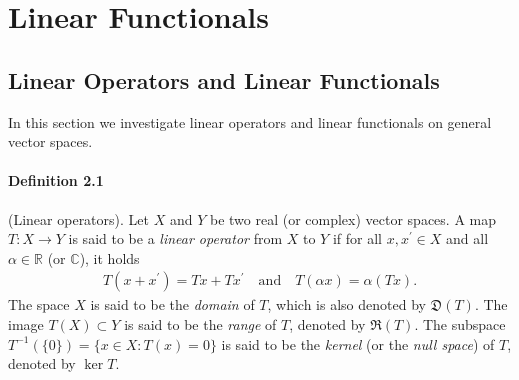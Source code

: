 \documentclass{article}
\begin{document}
\newpage
\section{Linear Functionals}
\subsection{Linear Operators and Linear Functionals}
In this section we investigate linear operators and linear functionals on general vector spaces.
\paragraph{Definition 2.1\label{def:2.1}} (Linear operators). Let $X$ and $Y$ be two real (or complex) vector spaces. A map $T:X\to Y$ is said to be a \textit{linear operator} from $X$ to $Y$ if for all $x,x^\prime\in X$ and all $\alpha\in\mathbb{R}$ (or $\mathbb{C}$), it holds
\begin{align*}
	T(x+x^\prime) = Tx + Tx^\prime\quad \text{and}\quad T(\alpha x) = \alpha (Tx).
\end{align*}
The space $X$ is said to be the \textit{domain} of $T$, which is also denoted by $\mathfrak{D}(T)$. The image $T(X)\subset Y$ is said to be the \textit{range} of $T$, denoted by $\mathfrak{R}(T)$. The subspace $T^{-1}(\{0\}) = \{x\in X:T(x)=0\}$ is said to be the \textit{kernel} (or the \textit{null space}) of $T$, denoted by $\ker T$.
\end{document}
